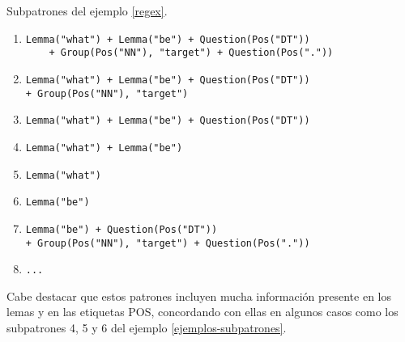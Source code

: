 \begin{example}\label{ejemplos-subpatrones} Subpatrones del ejemplo \ref{regex}.
\begin{enumerate}
\item \begin{lstlisting}
Lemma("what") + Lemma("be") + Question(Pos("DT"))
    + Group(Pos("NN"), "target") + Question(Pos("."))
\end{lstlisting}

\item
\begin{lstlisting}
Lemma("what") + Lemma("be") + Question(Pos("DT"))
+ Group(Pos("NN"), "target")
\end{lstlisting}

\item
\begin{lstlisting}
Lemma("what") + Lemma("be") + Question(Pos("DT"))
\end{lstlisting}

\item
\begin{lstlisting}
Lemma("what") + Lemma("be")
\end{lstlisting}

\item
\begin{lstlisting}
Lemma("what")
\end{lstlisting}

\item
\begin{lstlisting}
Lemma("be")
\end{lstlisting}

\item
\begin{lstlisting}
Lemma("be") + Question(Pos("DT"))
+ Group(Pos("NN"), "target") + Question(Pos("."))
\end{lstlisting}

\item
\begin{lstlisting}
...
\end{lstlisting}
\end{enumerate}
\end{example}

Cabe destacar que estos patrones incluyen mucha información presente en los lemas y en las etiquetas POS, concordando con ellas en algunos casos como los subpatrones 4, 5 y 6 del ejemplo \ref{ejemplos-subpatrones}.

